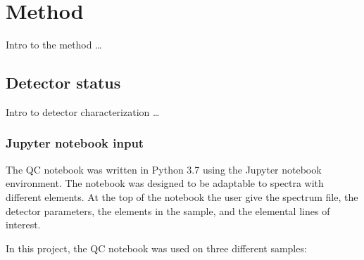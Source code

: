 \chapter{Method}
\label{ch:method}

Intro to the method \dots


\section{Detector status}
\label{method:detector_status}

Intro to detector characterization \dots

\subsection{Jupyter notebook input}
\label{method:detector_status:input}

The QC notebook was written in Python 3.7 using the Jupyter notebook environment.
The notebook was designed to be adaptable to spectra with different elements.
At the top of the notebook the user give the spectrum file, the detector parameters, the elements in the sample, and the elemental lines of interest.

In this project, the QC notebook was used on three different samples: 





